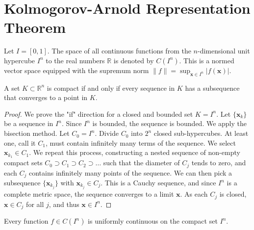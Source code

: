 \chapter{Kolmogorov-Arnold Representation Theorem}

\begin{definition}
    \label{def:Continuous_Functions}
    Let $I = [0, 1]$. The space of all continuous functions from the $n$-dimensional unit hypercube $I^n$ to the real numbers $\mathbb{R}$ is denoted by $C(I^n)$. This is a normed vector space equipped with the supremum norm $\|f\| = \sup_{\mathbf{x} \in I^n} |f(\mathbf{x})|$.
\end{definition}

\begin{lemma}
    \label{lem:Bolzano_Weierstrass}
    A set $K \subset \mathbb{R}^n$ is compact if and only if every sequence in $K$ has a subsequence that converges to a point in $K$.
\end{lemma}

\begin{proof}
    We prove the "if" direction for a closed and bounded set $K=I^n$. Let $\{\mathbf{x}_k\}$ be a sequence in $I^n$. Since $I^n$ is bounded, the sequence is bounded. We apply the bisection method. Let $C_0 = I^n$. Divide $C_0$ into $2^n$ closed sub-hypercubes. At least one, call it $C_1$, must contain infinitely many terms of the sequence. We select $\mathbf{x}_{k_1} \in C_1$. We repeat this process, constructing a nested sequence of non-empty compact sets $C_0 \supset C_1 \supset C_2 \supset \dots$ such that the diameter of $C_j$ tends to zero, and each $C_j$ contains infinitely many points of the sequence. We can then pick a subsequence $\{\mathbf{x}_{k_j}\}$ with $\mathbf{x}_{k_j} \in C_j$. This is a Cauchy sequence, and since $I^n$ is a complete metric space, the sequence converges to a limit $\mathbf{x}$. As each $C_j$ is closed, $\mathbf{x} \in C_j$ for all $j$, and thus $\mathbf{x} \in I^n$.
\end{proof}

\begin{lemma}
    \label{lem:Uniform_Continuity}
    Every function $f \in C(I^n)$ is uniformly continuous on the compact set $I^n$.
\end{lemma}

